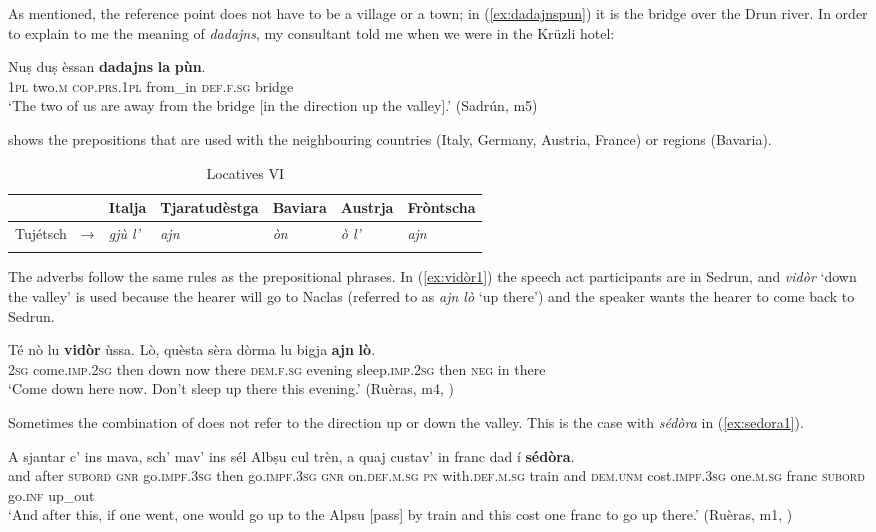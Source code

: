As mentioned, the reference point does not have to be a village or a town; in (\ref{ex:dadajnspun}) it is the bridge over the Drun river. In order to explain to me the meaning of \textit{dadajns}, my consultant told me when we were in the Krüzli hotel:

\ea
\label{ex:dadajnspun}
\gll Nuṣ duṣ èssan \textbf{dadajns} \textbf{la} \textbf{pùn}.\\
\textsc{1pl} two.\textsc{m} \textsc{cop.prs.1pl} from\_in \textsc{def.f.sg} bridge\\
\glt `The two of us are away from the bridge [in the direction up the valley].' (Sadrún, m5)
\z


 shows the prepositions that are used with the neighbouring countries (Italy, Germany, Austria, France) or regions (Bavaria).

\begin{table}
	\caption{Locatives VI}
	\label{loc6}
	\begin{tabular}{lllllll}
		\lsptoprule
		& & Italja & Tjaratudèstga  & Baviara & Austrja & Fròntscha\\ 
		\midrule
		Tujétsch  &    →& \textit{gjù l'} &  \textit{ajn}   &  \textit{òn} & \textit{ò l'} & \textit{ajn}\\
		\lspbottomrule
	\end{tabular}
\end{table}

The adverbs follow the same rules as the prepositional phrases. In (\ref{ex:vidòr1}) the speech act participants are in Sedrun, and \textit{vidòr} `down the valley' is used because the hearer will go to Naclas (referred to as \textit{ajn lò} `up there') and the speaker wants the hearer to come back to Sedrun.

\ea
\label{ex:vidòr1}
\gll Té nò lu \textbf{vidòr} ùssa. Lò, quèsta sèra dòrma lu bigja \textbf{ajn} \textbf{lò}.\\
\textsc{2sg} come.\textsc{imp.2sg} then down now there  \textsc{dem.f.sg} evening sleep.\textsc{imp.2sg} then \textsc{neg} in there\\
\glt `Come down here now. Don’t sleep up there this evening.' (Ruèras, m4, )
\z

Sometimes the combination of  does not refer to the direction up or down the valley. This is the case with \textit{sédòra} in (\ref{ex:sedora1}).

\ea
\label{ex:sedora1}
\gll    A sjantar c’ ins mava, sch’ mav’ ins sél Albṣu cul trèn, a quaj custav’ in franc dad í \textbf{sédòra}.\\
and after \textsc{subord} \textsc{gnr}  go.\textsc{impf.3sg} then go.\textsc{impf.3sg} \textsc{gnr} on.\textsc{def.m.sg} \textsc{pn} with.\textsc{def.m.sg} train and \textsc{dem.unm} cost.\textsc{impf.3sg} one.\textsc{m.sg}  franc \textsc{subord} go.\textsc{inf} up\_out \\
\glt `And after this, if one went, one would go up to the Alpsu [pass] by train and this cost one franc to go up there.' (Ruèras, m1, )
\z


